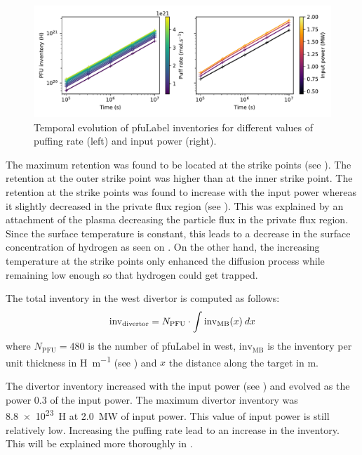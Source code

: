 \begin{figure}[h]
    \centering
    \includegraphics[width=\linewidth]{Figures/Chapter4/WEST/inventory_vs_time_west.pdf}
    \caption{Temporal evolution of \gls{pfuLabel} inventories for different values of puffing rate (left) and input power (right).}
\end{figure}

The maximum \gls{retention} was found to be located at the \glspl{strike point} (see ).
The \gls{retention} at the outer strike point was higher than at the inner strike point.
The \gls{retention} at the \glspl{strike point} was found to increase with the input power whereas it slightly decreased in the \gls{private flux region} (see ).
This was explained by an attachment of the \gls{plasma} decreasing the particle flux in the \gls{private flux region}.
Since the surface temperature is constant, this leads to a decrease in the surface concentration of hydrogen as seen on .
On the other hand, the increasing temperature at the \glspl{strike point} only enhanced the \gls{diffusion} process while remaining low enough so that hydrogen could get trapped.

The total \gls{inventory} in the \gls{west} \gls{divertor} is computed as follows:
\begin{equation}
    \mathrm{inv}_\mathrm{divertor} = N_\mathrm{PFU} \cdot \int \mathrm{inv}_\mathrm{MB}(x)\: dx
    \labeq{inventory WEST}
\end{equation}
where $N_\mathrm{PFU} = 480$ is the number of \gls{pfuLabel} in \gls{west}, $\mathrm{inv}_\mathrm{MB}$ is the \gls{inventory} per unit thickness in \si{H.m^{-1}} (see ) and $x$ the distance along the target in \si{m}.

The \gls{divertor} \gls{inventory} increased with the input power (see ) and evolved as the power 0.3 of the input power.
The maximum \gls{divertor} \gls{inventory} was \SI{8.8e23}{H} at \SI{2.0}{MW} of input power.
This value of input power is still relatively low.
Increasing the puffing rate lead to an increase in the \gls{inventory}.
This will be explained more thoroughly in .

